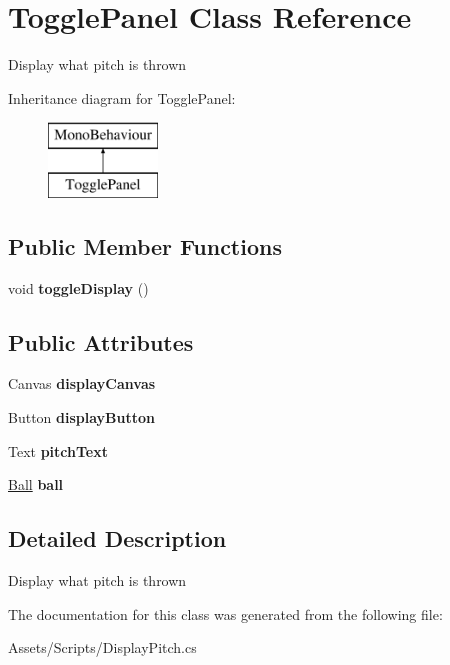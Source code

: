\hypertarget{class_toggle_panel}{}\section{Toggle\+Panel Class Reference}
\label{class_toggle_panel}


Display what pitch is thrown  


Inheritance diagram for Toggle\+Panel\+:\begin{figure}[H]
\begin{center}
\leavevmode
\includegraphics[height=2.000000cm]{class_toggle_panel}
\end{center}
\end{figure}
\subsection*{Public Member Functions}
\begin{DoxyCompactItemize}
\item 
void {\bfseries toggle\+Display} ()\hypertarget{class_toggle_panel_a0c3d14a87f1edf5411e6d55ef43e1e5b}{}\label{class_toggle_panel_a0c3d14a87f1edf5411e6d55ef43e1e5b}

\end{DoxyCompactItemize}
\subsection*{Public Attributes}
\begin{DoxyCompactItemize}
\item 
Canvas {\bfseries display\+Canvas}\hypertarget{class_toggle_panel_a5c6b5e1051f931a7dbb1626e6f8bfd93}{}\label{class_toggle_panel_a5c6b5e1051f931a7dbb1626e6f8bfd93}

\item 
Button {\bfseries display\+Button}\hypertarget{class_toggle_panel_ab79916d24aab6f053038696018337da2}{}\label{class_toggle_panel_ab79916d24aab6f053038696018337da2}

\item 
Text {\bfseries pitch\+Text}\hypertarget{class_toggle_panel_a6797c3c9808de4e58a74ea988d6deaa4}{}\label{class_toggle_panel_a6797c3c9808de4e58a74ea988d6deaa4}

\item 
\hyperlink{class_ball}{Ball} {\bfseries ball}\hypertarget{class_toggle_panel_a4976abcd853106401a778160db874190}{}\label{class_toggle_panel_a4976abcd853106401a778160db874190}

\end{DoxyCompactItemize}


\subsection{Detailed Description}
Display what pitch is thrown 



The documentation for this class was generated from the following file\+:\begin{DoxyCompactItemize}
\item 
Assets/\+Scripts/Display\+Pitch.\+cs\end{DoxyCompactItemize}
